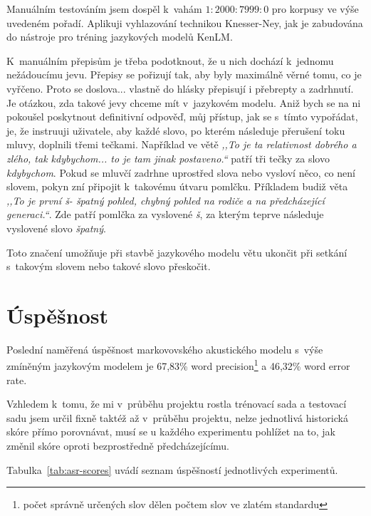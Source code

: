 Manuálním testováním jsem dospěl k~vahám $1 : 2000 : 7999 : 0$ pro korpusy ve
výše uvedeném pořadí. Aplikuji vyhlazování technikou
Knesser-Ney\cite{chen1999empirical}, jak je zabudována do nástroje pro tréning
jazykových modelů KenLM\cite{heafield2011kenlm}.

K~manuálním přepisům je třeba podotknout, že u nich dochází k~jednomu
nežádoucímu jevu. Přepisy se pořizují tak, aby byly maximálně věrné tomu, co je
vyřčeno. Proto se doslova... vlastně do hlásky přepisují i přebrepty a zadrhnutí.
Je otázkou, zda takové jevy chceme mít v~jazykovém modelu. Aniž bych se na ni
pokoušel poskytnout definitivní odpověď, můj přístup, jak se s~tímto vypořádat,
je, že instruuji uživatele, aby každé slovo, po kterém následuje přerušení toku
mluvy, doplnili třemi tečkami. Například ve větě {\em ,,To je ta relativnost
dobrého a zlého, tak kdybychom... to je tam jinak postaveno.``} patří tři tečky
za slovo {\em kdybychom}. Pokud se mluvčí zadrhne uprostřed slova nebo vysloví
něco, co není slovem, pokyn zní připojit k~takovému útvaru pomlčku. Příkladem
budiž věta {\em ,,To je první š- špatný pohled, chybný pohled na rodiče a na
předcházející generaci.``}. Zde patří pomlčka za vyslovené {\em š}, za kterým
teprve následuje vyslovené slovo {\em špatný}.

Toto značení umožňuje při stavbě jazykového modelu větu ukončit při setkání
s~takovým slovem nebo takové slovo přeskočit.

\section{Úspěšnost}
\label{sec:evaluace}

Poslední naměřená úspěšnost markovovského akustického modelu s~výše zmíněným
jazykovým modelem je 67,83\% word precision\footnote{počet správně určených slov
dělen počtem slov ve zlatém standardu} a 46,32\% word error rate.

Vzhledem k~tomu, že mi v~průběhu projektu rostla trénovací sada a testovací sadu
jsem určil fixně taktéž až v~průběhu projektu, nelze jednotlivá historická skóre přímo
porovnávat, musí se u každého experimentu pohlížet na to, jak změnil skóre
oproti bezprostředně předcházejícímu.

Tabulka~\ref{tab:asr-scores} uvádí seznam úspěšností jednotlivých experimentů.

